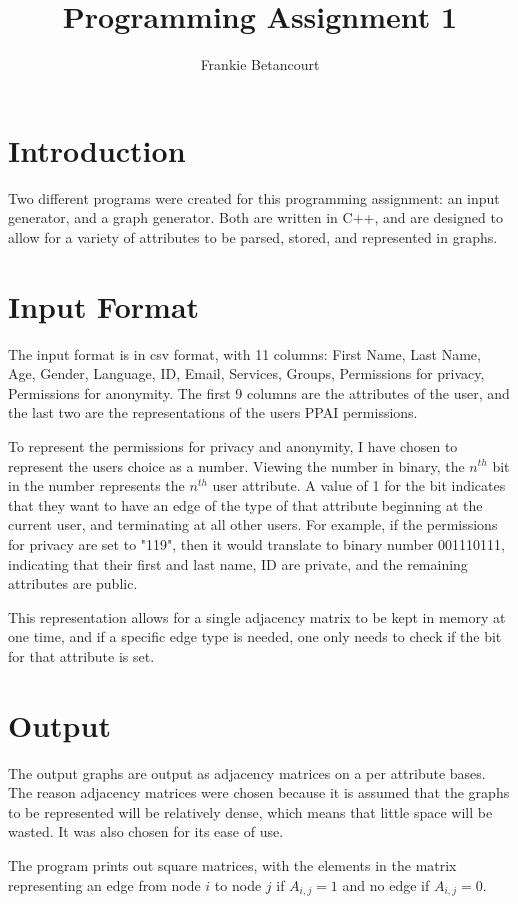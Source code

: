 \documentclass{article}
\title{Programming Assignment 1}
\author{Frankie Betancourt}
\begin{document}
\maketitle

\section{Introduction}
Two different programs were created for this programming assignment: an input
generator, and a graph generator. Both are written in C++, and are designed
to allow for a variety of attributes to be parsed, stored, and represented 
in graphs. 

\section{Input Format}
The input format is in csv format, with 11 columns: 
First Name, Last Name, Age, Gender, Language, ID, Email, Services, Groups,
Permissions for privacy, Permissions for anonymity. The first 9 columns are the
attributes of the user, and the last two are the representations of the users 
PPAI permissions. 

To represent the permissions for privacy and anonymity, I have chosen to 
represent the users choice as a number. Viewing the number in binary, the 
\(n^{th}\) bit in the number represents the \(n^{th}\) user attribute. A value 
of 1 for the bit indicates that they want to have an edge of the type of 
that attribute beginning at the current user, and terminating at all other
users. For example, if the permissions for privacy are set to "119", then 
it would translate to binary number 001110111, indicating that their first and
last name, ID are private, and the remaining attributes are public. 

This representation allows for a single adjacency matrix to be kept in memory 
at one time, and if a specific edge type is needed, one only needs to check if 
the bit for that attribute is set.

\section{Output} 
The output graphs are output as adjacency matrices on a per attribute bases. 
The reason adjacency matrices were chosen because it is assumed that the graphs
to be represented will be relatively dense, which means that little space will
be wasted. It was also chosen for its ease of use. 

The program prints out square matrices, with the elements in the matrix 
representing an edge from node \(i\) to node \(j\) if \(A_{i,j} = 1\) 
and no edge if \(A_{i,j} = 0\).
\end{document}
